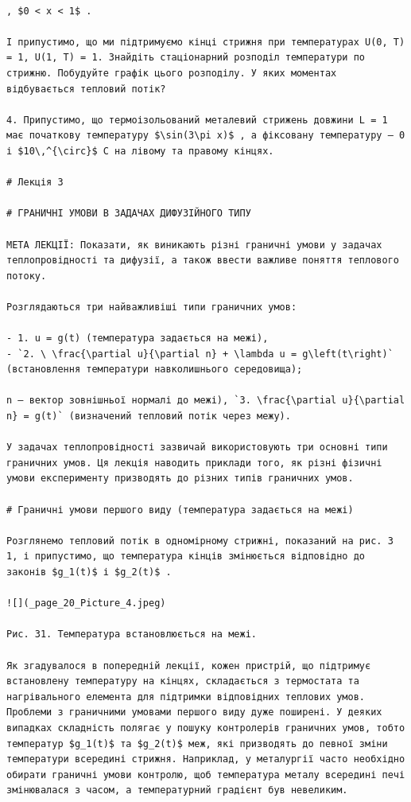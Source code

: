 \documentclass[
  ukrainian,
]{article}
\begin{document}
\begin{verbatim}

, $0 < x < 1$ .

І припустимо, що ми підтримуємо кінці стрижня при температурах U(0, T) = 1, U(1, T) = 1. Знайдіть стаціонарний розподіл температури по стрижню. Побудуйте графік цього розподілу. У яких моментах відбувається тепловий потік?

4. Припустимо, що термоізольований металевий стрижень довжини L = 1 має початкову температуру $\sin(3\pi x)$ , а фіксовану температуру — 0 і $10\,^{\circ}$ C на лівому та правому кінцях.

# Лекція 3

# ГРАНИЧНІ УМОВИ В ЗАДАЧАХ ДИФУЗІЙНОГО ТИПУ

МЕТА ЛЕКЦІЇ: Показати, як виникають різні граничні умови у задачах теплопровідності та дифузії, а також ввести важливе поняття теплового потоку.

Розглядаються три найважливіші типи граничних умов:

- 1. u = g(t) (температура задається на межі),
- `2. \ \frac{\partial u}{\partial n} + \lambda u = g\left(t\right)` (встановлення температури навколишнього середовища);

n — вектор зовнішньої нормалі до межі), `3. \frac{\partial u}{\partial n} = g(t)` (визначений тепловий потік через межу).

У задачах теплопровідності зазвичай використовують три основні типи граничних умов. Ця лекція наводить приклади того, як різні фізичні умови експерименту призводять до різних типів граничних умов.

# Граничні умови першого виду (температура задається на межі)

Розглянемо тепловий потік в одномірному стрижні, показаний на рис. 3 1, і припустимо, що температура кінців змінюється відповідно до законів $g_1(t)$ і $g_2(t)$ .

![](_page_20_Picture_4.jpeg)

Рис. 31. Температура встановлюється на межі.

Як згадувалося в попередній лекції, кожен пристрій, що підтримує встановлену температуру на кінцях, складається з термостата та нагрівального елемента для підтримки відповідних теплових умов. Проблеми з граничними умовами першого виду дуже поширені. У деяких випадках складність полягає у пошуку контролерів граничних умов, тобто температур $g_1(t)$ та $g_2(t)$ меж, які призводять до певної зміни температури всередині стрижня. Наприклад, у металургії часто необхідно обирати граничні умови контролю, щоб температура металу всередині печі змінювалася з часом, а температурний градієнт був невеликим.


\end{verbatim}
\end{document}
